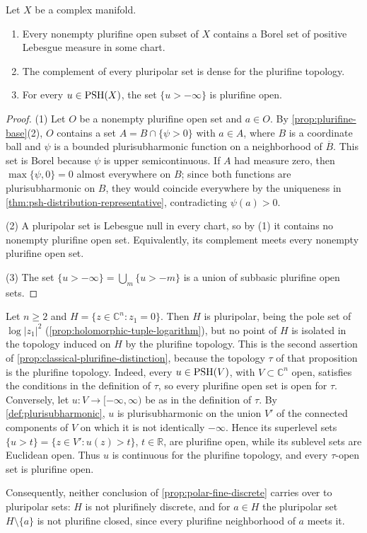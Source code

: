 \begin{proposition}\label{prop:plurifine-positive-volume}
Let $X$ be a complex manifold.
\begin{enumerate}
\item Every nonempty plurifine open subset of $X$ contains a Borel set of positive Lebesgue measure in some chart.
\item The complement of every pluripolar set is dense for the plurifine topology.
\item For every $u\in\mathrm{PSH}(X)$, the set $\{u>-\infty\}$ is plurifine open.
\end{enumerate}
\end{proposition}
\begin{proof}
(1) Let $O$ be a nonempty plurifine open set and $a\in O$. By \cref{prop:plurifine-base}(2), $O$ contains a set $A=B\cap\{\psi>0\}$ with $a\in A$, where $B$ is a coordinate ball and $\psi$ is a bounded plurisubharmonic function on a neighborhood of $\overline B$. This set is Borel because $\psi$ is upper semicontinuous. If $A$ had measure zero, then $\max\{\psi,0\}=0$ almost everywhere on $B$; since both functions are plurisubharmonic on $B$, they would coincide everywhere by the uniqueness in \cref{thm:psh-distribution-representative}, contradicting $\psi(a)>0$.

(2) A pluripolar set is Lebesgue null in every chart, so by (1) it contains no nonempty plurifine open set. Equivalently, its complement meets every nonempty plurifine open set.

(3) The set $\{u>-\infty\}=\bigcup_m\{u>-m\}$ is a union of subbasic plurifine open sets.
\end{proof}

\begin{example}\label{ex:pluripolar-hyperplane-not-discrete}
Let $n\ge2$ and $H=\{z\in\mathbb C^n:z_1=0\}$. Then $H$ is pluripolar, being the pole set of $\log|z_1|^2$ (\cref{prop:holomorphic-tuple-logarithm}), but no point of $H$ is isolated in the topology induced on $H$ by the plurifine topology. This is the second assertion of \cref{prop:classical-plurifine-distinction}, because the topology $\tau$ of that proposition is the plurifine topology. Indeed, every $u\in\mathrm{PSH}(V)$, with $V\subset\mathbb C^n$ open, satisfies the conditions in the definition of $\tau$, so every plurifine open set is open for $\tau$. Conversely, let $u\colon V\to[-\infty,\infty)$ be as in the definition of $\tau$. By \cref{def:plurisubharmonic}, $u$ is plurisubharmonic on the union $V'$ of the connected components of $V$ on which it is not identically $-\infty$. Hence its superlevel sets $\{u>t\}=\{z\in V':u(z)>t\}$, $t\in\mathbb R$, are plurifine open, while its sublevel sets are Euclidean open. Thus $u$ is continuous for the plurifine topology, and every $\tau$-open set is plurifine open.

Consequently, neither conclusion of \cref{prop:polar-fine-discrete} carries over to pluripolar sets: $H$ is not plurifinely discrete, and for $a\in H$ the pluripolar set $H\setminus\{a\}$ is not plurifine closed, since every plurifine neighborhood of $a$ meets it.
\end{example}

